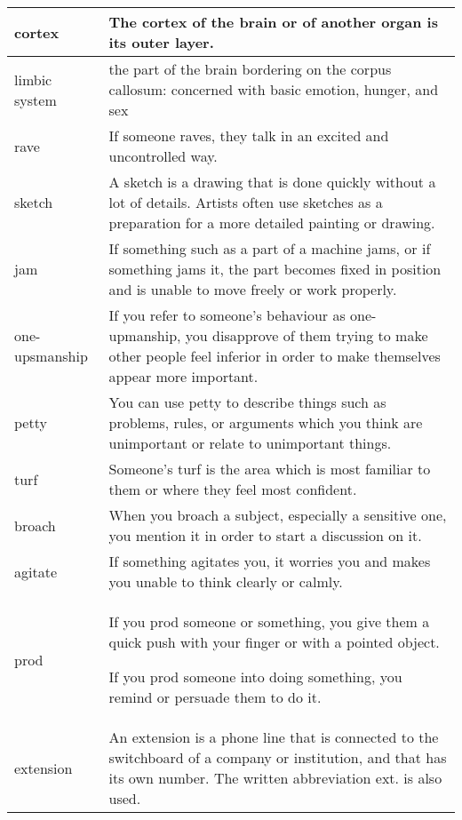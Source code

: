 \documentclass{article}
\begin{document}
\begin{center}
\begin{longtable}{|l|p{9cm}|}
\hline
cortex
&
The cortex of the brain or of another organ is its outer layer.
\\

\hline
limbic system
&
the part of the brain bordering on the corpus callosum: concerned with basic emotion, hunger, and sex
\\

\hline
rave
&
If someone raves, they talk in an excited and uncontrolled way.
\\

\hline
sketch
&
A sketch is a drawing that is done quickly without a lot of details. Artists often use sketches as a preparation for a more detailed painting or drawing.
\\

\hline
jam
&
If something such as a part of a machine jams, or if something jams it, the part becomes fixed in position and is unable to move freely or work properly.
\\

\hline
one-upsmanship
&
If you refer to someone's behaviour as one-upmanship, you disapprove of them trying to make other people feel inferior in order to make themselves appear more important.
\\

\hline
petty
&
You can use petty to describe things such as problems, rules, or arguments which you think are unimportant or relate to unimportant things.
\\

\hline
turf
&
Someone's turf is the area which is most familiar to them or where they feel most confident.
\\

\hline
broach
&
When you broach a subject, especially a sensitive one, you mention it in order to start a discussion on it.
\\

\hline
agitate
&
If something agitates you, it worries you and makes you unable to think clearly or calmly.
\\

\hline
prod
&
If you prod someone or something, you give them a quick push with your finger or with a pointed object.
\par
If you prod someone into doing something, you remind or persuade them to do it.
\\

\hline
extension
&
An extension is a phone line that is connected to the switchboard of a company or institution, and that has its own number. The written abbreviation ext. is also used.
\\


\end{longtable}
\end{center}
\end{document}
